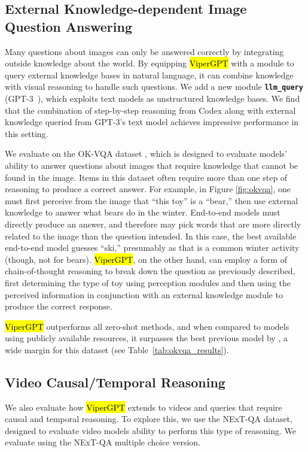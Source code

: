 \documentclass[10pt,twocolumn,letterpaper]{article}
\newcommand{\viper}[0]{{\small\fontfamily{txtt}\selectfont \textcolor{mygreen}{\hl{ViperGPT}}}\xspace}
\begin{document}
\subsection{External Knowledge-dependent Image Question Answering}

Many questions about images can only be answered correctly by integrating outside knowledge about the world. By equipping \viper with a module to query external knowledge bases in natural language, it can combine knowledge with visual reasoning to handle such questions. We add a new module \texttt{\textbf{llm\_query}} ({\footnotesize GPT-3~\cite{brown_language_2020}}), which exploits text models as unstructured knowledge bases. We find that the combination of step-by-step reasoning from Codex along with external knowledge queried from \mbox{GPT-3}'s text model achieves impressive performance in this setting.

We evaluate on the OK-VQA dataset \cite{marino_ok-vqa_2019}, which is designed to evaluate models' ability to answer questions about images that require knowledge that cannot be found in the image. Items in this dataset often require more than one step of reasoning to produce a correct answer. For example, in Figure \ref{fig:okvqa}, one must first perceive from the image that ``this toy'' is a ``bear,'' then use external knowledge to answer what bears do in the winter. End-to-end models must directly produce an answer, and therefore may pick words that are more directly related to the image than the question intended. In this case, the best available end-to-end model guesses ``ski,'' presumably as that is a common winter activity (though, not for bears). \viper, on the other hand, can employ a form of chain-of-thought reasoning \cite{wei_chain_2022} to break down the question as previously described, first determining the type of toy using perception modules and then using the perceived information in conjunction with an external knowledge module to produce the correct response.

\viper outperforms all zero-shot methods, and when compared to models using publicly available resources, it surpasses the best previous model by , a wide margin for this dataset (see Table~\ref{tab:okvqa_results}).

\subsection{Video Causal/Temporal Reasoning}

We also evaluate how \viper extends to videos and queries that require causal and temporal reasoning. To explore this, we use the NExT-QA dataset, designed to evaluate video models ability to perform this type of reasoning. 
We evaluate using the NExT-QA multiple choice version.
\end{document}
